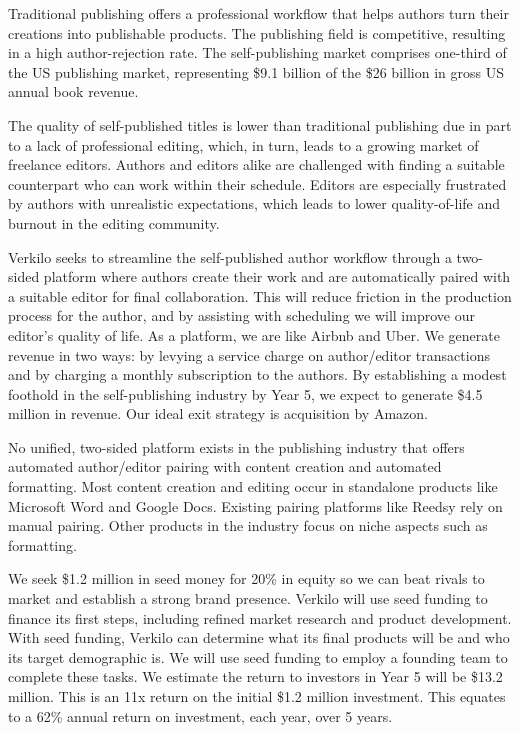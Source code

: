 \documentclass[11pt,openany]{book}
\begin{document}
Traditional publishing offers a professional workflow that helps authors
turn their creations into publishable products. The publishing field is
competitive, resulting in a high author-rejection rate. The
self-publishing market comprises one-third of the US publishing market,
representing \$9.1 billion of the \$26 billion in gross US annual book
revenue.

The quality of self-published titles is lower than traditional
publishing due in part to a lack of professional editing, which, in
turn, leads to a growing market of freelance editors. Authors and
editors alike are challenged with finding a suitable counterpart who can
work within their schedule. Editors are especially frustrated by authors
with unrealistic expectations, which leads to lower quality-of-life and
burnout in the editing community.

Verkilo seeks to streamline the self-published author workflow through a
two-sided platform where authors create their work and are automatically
paired with a suitable editor for final collaboration. This will reduce
friction in the production process for the author, and by assisting with
scheduling we will improve our editor's quality of life. As a platform,
we are like Airbnb and Uber. We generate revenue in two ways: by levying
a service charge on author/editor transactions and by charging a monthly
subscription to the authors. By establishing a modest foothold in the
self-publishing industry by Year 5, we expect to generate \$4.5 million
in revenue. Our ideal exit strategy is acquisition by Amazon.

No unified, two-sided platform exists in the publishing industry that
offers automated author/editor pairing with content creation and
automated formatting. Most content creation and editing occur in
standalone products like Microsoft Word and Google Docs. Existing
pairing platforms like Reedsy rely on manual pairing. Other products in
the industry focus on niche aspects such as formatting.

We seek \$1.2 million in seed money for 20\% in equity so we can beat
rivals to market and establish a strong brand presence. Verkilo will use
seed funding to finance its first steps, including refined market
research and product development. With seed funding, Verkilo can
determine what its final products will be and who its target demographic
is. We will use seed funding to employ a founding team to complete these
tasks. We estimate the return to investors in Year 5 will be \$13.2
million. This is an 11x return on the initial \$1.2 million investment.
This equates to a 62\% annual return on investment, each year, over 5
years.
\end{document}
